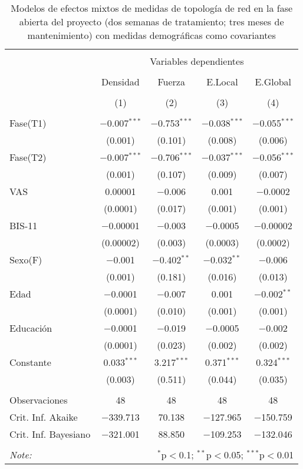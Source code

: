 \begin{table}[!htbp] \centering
    \small
  \caption{Modelos de efectos mixtos de medidas de topología de red en la fase abierta del proyecto (dos semanas de tratamiento; tres meses de mantenimiento) con medidas demográficas como covariantes}
  \label{tab:memL1}
\begin{tabular}{@{\extracolsep{5pt}}lcccc}
\\[-1.8ex]\hline
\hline \\[-1.8ex]
 & \multicolumn{4}{c}{Variables dependientes} \\
\cline{2-5}
\\[-1.8ex] & Densidad & Fuerza & E.Local & E.Global \\
\\[-1.8ex] & (1) & (2) & (3) & (4)\\
\hline \\[-1.8ex]
 Fase(T1) & $-$0.007$^{***}$ & $-$0.753$^{***}$ & $-$0.038$^{***}$ & $-$0.055$^{***}$ \\
  & (0.001) & (0.101) & (0.008) & (0.006) \\
  Fase(T2) & $-$0.007$^{***}$ & $-$0.706$^{***}$ & $-$0.037$^{***}$ & $-$0.056$^{***}$ \\
  & (0.001) & (0.107) & (0.009) & (0.007) \\
  VAS & 0.00001 & $-$0.006 & 0.001 & $-$0.0002 \\
  & (0.0001) & (0.017) & (0.001) & (0.001) \\
  BIS-11 & $-$0.00001 & $-$0.003 & $-$0.0005 & $-$0.00002 \\
  & (0.00002) & (0.003) & (0.0003) & (0.0002) \\
  Sexo(F) & $-$0.001 & $-$0.402$^{**}$ & $-$0.032$^{**}$ & $-$0.006 \\
  & (0.001) & (0.181) & (0.016) & (0.013) \\
  Edad & $-$0.0001 & $-$0.007 & 0.001 & $-$0.002$^{**}$ \\
  & (0.0001) & (0.010) & (0.001) & (0.001) \\
  Educación & $-$0.0001 & $-$0.019 & $-$0.0005 & $-$0.002 \\
  & (0.0001) & (0.023) & (0.002) & (0.002) \\
  Constante & 0.033$^{***}$ & 3.217$^{***}$ & 0.371$^{***}$ & 0.324$^{***}$ \\
  & (0.003) & (0.511) & (0.044) & (0.035) \\
 \hline \\[-1.8ex]
Observaciones & 48 & 48 & 48 & 48 \\
Crit. Inf. Akaike & $-$339.713 & 70.138 & $-$127.965 & $-$150.759 \\
Crit. Inf. Bayesiano & $-$321.001 & 88.850 & $-$109.253 & $-$132.046 \\
\hline
\hline \\[-1.8ex]
\textit{Note:}  & \multicolumn{4}{r}{$^{*}$p$<$0.1; $^{**}$p$<$0.05; $^{***}$p$<$0.01} \\
\end{tabular}
\end{table}

